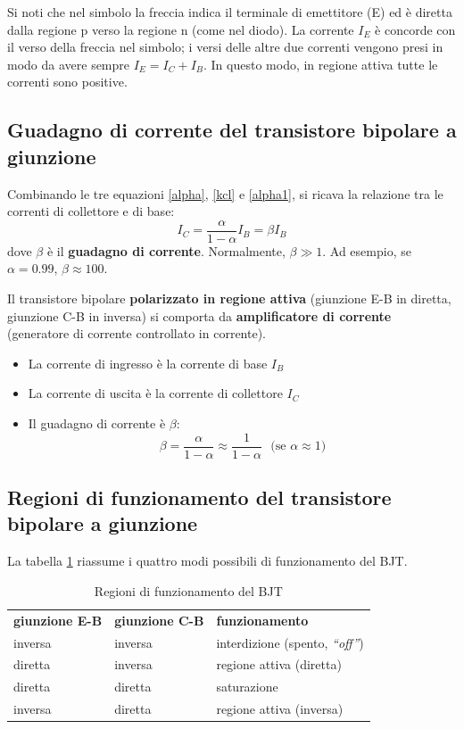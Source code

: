 \documentclass[10pt,a4paper,twoside,twocolumn]{article}
\newcommand{\hfrac}{\rule[-1ex]{0ex}{3.5ex}} %
\begin{document}
Si noti che nel simbolo la freccia indica il terminale di emettitore (E) ed \`e diretta dalla regione p verso la regione n (come nel diodo).
La corrente $I_E$ \`e concorde con il verso della freccia nel simbolo; i versi delle altre due correnti vengono presi in modo da avere sempre 
$I_E = I_C + I_B$.
In questo modo, in regione attiva tutte le correnti sono positive.



\subsection{Guadagno di corrente del transistore bipolare a  giunzione}
Combinando le tre equazioni \eqref{alpha}, \eqref{kcl} e \eqref{alpha1}, si ricava la relazione tra le correnti di collettore e di base:
\begin{equation}
I_C = \frac{\alpha}{1 - \alpha} I_B = \beta I_B
\label{beta} 
\end{equation}
dove
$\beta$ \`e il \textbf{guadagno di corrente}.
Normalmente, $\beta \gg 1$.
Ad esempio, se $\alpha = 0.99$, $\beta \approx 100$.

Il transistore bipolare \textbf{polarizzato in regione attiva} 
(giunzione E-B in diretta, giunzione C-B in inversa) 
si comporta da \textbf{amplificatore di corrente} 
(generatore di corrente controllato in corrente).
\begin{itemize}
\item
La corrente di ingresso \`e la corrente di base $I_B$
\item
La corrente di uscita \`e la corrente di collettore $I_C$
\item
Il guadagno di corrente \`e $\beta$:
\[
\beta = \frac{\alpha}{1 - \alpha} \approx \frac{1}{1 - \alpha} \text{~ (se~} \alpha \approx 1)
\]
\end{itemize}



\subsection{Regioni di funzionamento del transistore bipolare a  giunzione}
La tabella \ref{funz} riassume i quattro modi possibili di funzionamento del BJT.
\begin{table}
\begin{center}
\caption{Regioni di funzionamento del BJT}
\label{funz}
\begin{tabular}{|p{1.6cm}|p{1.7cm}||p{3.3cm}}
\textbf{giunzione E-B} & \textbf{giunzione C-B} & \textbf{funzionamento} \hfrac \\  
inversa & inversa & interdizione (spento, \emph{``off''}) \hfrac \\ 
diretta & inversa & regione attiva (diretta) \hfrac \\ 
diretta & diretta & saturazione \hfrac \\ 
inversa & diretta & regione attiva (inversa) \hfrac \\ 
\end{tabular}
\end{center}
\end{table}
\end{document}
